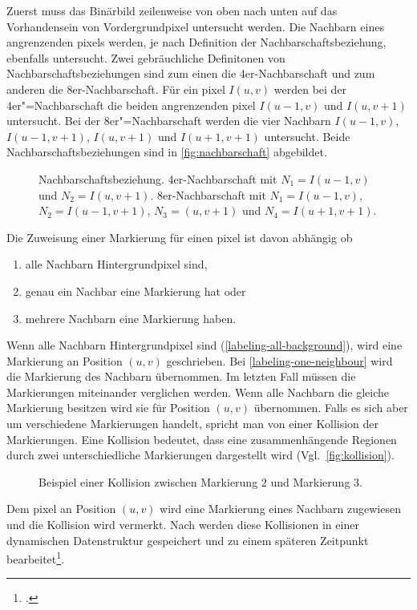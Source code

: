 Zuerst muss das Binärbild zeilenweise von oben nach unten auf das Vorhandensein von Vordergrundpixel untersucht werden.
Die Nachbarn eines angrenzenden \glspl{pixel} werden, je nach Definition der Nachbarschaftsbeziehung, ebenfalls
 untersucht. Zwei gebräuchliche Definitonen von Nachbarschaftsbeziehungen sind zum einen die 4er-Nachbarschaft und zum
 anderen die 8er-Nachbarschaft. Für ein \gls{pixel} $I(u,v)$ werden bei der 4er"=Nachbarschaft die beiden angrenzenden
 \gls{pixel} $I(u-1,v)$ und $I(u,v+1)$ untersucht. Bei der 8er"=Nachbarschaft werden die vier Nachbarn $I(u-1,v)$,
 $I(u-1,v+1)$, $I(u,v+1)$ und $I(u+1,v+1)$ untersucht. Beide Nachbarschaftsbeziehungen sind in
 \autoref{fig:nachbarschaft} abgebildet.
\begin{figure}[!ht]
	\centering
	\subfigure[]{
		\label{fig:4er-nachbarschaft}
		
	}
	\subfigure[]{
		\label{fig:8er-nachbarschaft}
		
	}
	\caption{Nachbarschaftsbeziehung.  4er-Nachbarschaft mit $N_1 = I(u-1,v)$ und
	 $N_2 = I(u,v+1)$.  8er-Nachbarschaft mit $N_1 = I(u-1,v)$, $N_2 = I(u-1,v+1)$,
	 $N_3 = (u,v+1)$ und $N_4 = I(u+1,v+1)$.}
	\label{fig:nachbarschaft}
\end{figure}
Die Zuweisung einer Markierung für einen \gls{pixel} ist davon abhängig ob
\begin{enumerate}
	\item alle Nachbarn Hintergrundpixel sind, \label{labeling-all-background}
	\item genau ein Nachbar eine Markierung hat oder \label{labeling-one-neighbour}
	\item mehrere Nachbarn eine Markierung haben. \label{labeling-many-neighbours}
\end{enumerate}

Wenn alle Nachbarn Hintergrundpixel sind (\autoref{labeling-all-background}), wird eine Markierung an Position $(u,v)$
 geschrieben. Bei \autoref{labeling-one-neighbour} wird die Markierung des Nachbarn übernommen. Im letzten Fall müssen
 die Markierungen miteinander verglichen werden. Wenn alle Nachbarn die gleiche Markierung besitzen wird sie für
 Position $(u,v)$ übernommen. Falls es sich aber um verschiedene Markierungen handelt, spricht man von einer Kollision
 der Markierungen. Eine Kollision bedeutet, dass eine zusammenhängende Regionen durch zwei unterschiedliche
 Markierungen dargestellt wird (Vgl.~\autoref{fig:kollision}).
\begin{figure}[!ht]
	\centering
	
	\caption{Beispiel einer Kollision zwischen Markierung $2$ und Markierung $3$.}
	\label{fig:kollision}
\end{figure}
Dem \gls{pixel} an Position $(u,v)$ wird eine Markierung eines Nachbarn zugewiesen und die Kollision wird vermerkt. Nach
 \citeauthor{burger05} werden diese Kollisionen in einer dynamischen Datenstruktur gespeichert und zu einem späteren
 Zeitpunkt bearbeitet\footcite[Vgl.][S.~203--204]{burger05}.

